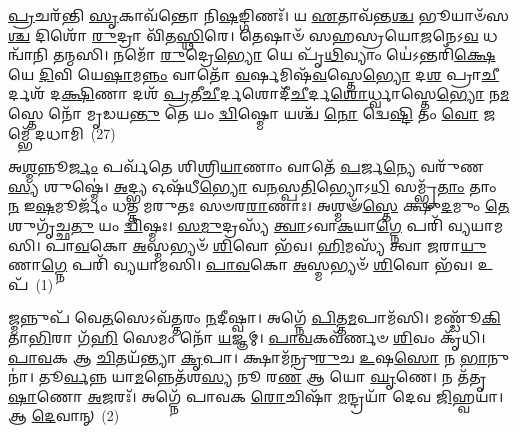 \-\ul{𑌪𑍍𑌰}\-𑌚𑌰᳴𑌨𑍍𑌤𑌿 \ul{𑌸𑍃}\-𑌕𑌾𑌵᳴𑌨𑍍𑌤𑍋 𑌨𑌿\-\ul{𑌷}\-𑌙𑍍𑌗𑌿𑌣𑌃᳴। 𑌯 \ul{𑌏}\-𑌤𑌾𑌵᳴𑌨𑍍𑌤\-\ul{𑌶𑍍𑌚} 𑌭𑍂𑌯𑌾𑍞᳴𑌸\-\ul{𑌶𑍍𑌚} 𑌦𑌿𑌶𑍋᳴ \ul{𑌰𑍁}\-𑌦𑍍𑌰𑌾 𑌵𑌿᳴𑌤\-\ul{𑌸𑍍𑌥𑌿}\-𑌰𑍇। 𑌤𑍇𑌷𑌾𑍞᳴ 𑌸𑌹𑌸𑍍𑌰𑌯𑍋\-\ul{𑌜}\-𑌨𑍇\-𑌽\-\ul{𑌵} 𑌧𑌨𑍍𑌵𑌾᳴𑌨𑌿 𑌤𑌨𑍍𑌮𑌸𑌿। 𑌨𑌮𑍋᳴ \ul{𑌰𑍁}\-𑌦𑍍𑌰𑍇\-\ul{𑌭𑍍𑌯𑍋} 𑌯𑍇 𑌪𑍃᳴\-\ul{𑌥𑌿}\-𑌵𑍍𑌯𑌾𑌂 𑌯𑍇॑\-𑌽𑌨𑍍𑌤𑌰𑌿᳴\-\ul{𑌕𑍍𑌷𑍇} 𑌯𑍇 \ul{𑌦𑌿}\-𑌵𑌿 𑌯𑍇\-\ul{𑌷𑌾}\-𑌮\-\ul{𑌨𑍍𑌨𑌂} 𑌵𑌾𑌤𑍋᳴ \ul{𑌵}\-𑌰𑍍\mbox{}𑌷𑌮𑌿𑌷᳴\-\ul{𑌵}\-𑌸𑍍𑌤𑍇\-\ul{𑌭𑍍𑌯𑍋} 𑌦\-\ul{𑌶} 𑌪𑍍𑌰𑌾\-\ul{𑌚𑍀}\-𑌰𑍍𑌦𑌶᳴ 𑌦\-\ul{𑌕𑍍𑌷𑌿}\-𑌣𑌾 𑌦𑌶᳴ \ul{𑌪𑍍𑌰}\-𑌤𑍀\-\ul{𑌚𑍀}\-𑌰𑍍𑌦𑌶𑍋𑌦𑍀᳴\-\ul{𑌚𑍀}\-𑌰𑍍𑌦\-\ul{𑌶𑍋}\-𑌰𑍍𑌧𑍍𑌵𑌾𑌸𑍍𑌤𑍇\-\ul{𑌭𑍍𑌯𑍋} 𑌨\-\ul{𑌮}\-𑌸𑍍𑌤𑍇 𑌨𑍋᳴ 𑌮𑍃𑌡𑌯\-\ul{𑌨𑍍𑌤𑍁} 𑌤𑍇 𑌯𑌂 \ul{𑌦𑍍𑌵𑌿}\-𑌷𑍍𑌮𑍋 𑌯𑌶𑍍𑌚᳴ \ul{𑌨𑍋} 𑌦𑍍𑌵𑍇\-\ul{𑌷𑍍𑌟𑌿} 𑌤𑌂 \ul{𑌵𑍋} 𑌜𑌮𑍍𑌭𑍇᳴ 𑌦𑌧𑌾𑌮𑌿~(27)


{\anuvakamend[{\-\ul{𑌤𑍀}\-𑌰𑍍𑌥𑌾\-\ul{𑌨𑌿} 𑌯\-\ul{𑌶𑍍𑌚} 𑌷𑌟𑍍𑌚᳴}]}%

{}


\setcounter{anuvakam}{0}
𑌅\-\ul{𑌶𑍍𑌮}\-𑌨𑍍𑌨𑍂\-\ul{𑌰𑍍𑌜𑌂} 𑌪𑌰𑍍𑌵᳴𑌤𑍇 𑌶𑌿𑌶𑍍𑌰𑌿\-\ul{𑌯𑌾}\-𑌣𑌾𑌂 𑌵𑌾𑌤𑍇᳴ \ul{𑌪}\-𑌰𑍍𑌜\-\ul{𑌨𑍍𑌯𑍇} 𑌵𑌰𑍁᳴𑌣\-\ul{𑌸𑍍𑌯} 𑌶𑍁𑌷𑍍𑌮𑍇॑। \ul{𑌅}\-𑌦𑍍𑌭𑍍𑌯 𑌓𑌷᳴𑌧𑍀\-\ul{𑌭𑍍𑌯𑍋} 𑌵\-\ul{𑌨}\-𑌸𑍍𑌪\-\ul{𑌤𑌿}\-𑌭𑍍𑌯𑍋\-𑌽\-\ul{𑌧𑌿} 𑌸𑌮𑍍𑌭𑍃᳴\-\ul{𑌤𑌾𑌂} 𑌤𑌾𑌂 \ul{𑌨} 𑌇\-\ul{𑌷}\-𑌮𑍂𑌰𑍍𑌜𑌂᳴ 𑌧𑌤𑍍𑌤 𑌮𑌰𑍁𑌤𑌃 𑌸𑍞𑌰\-\ul{𑌰𑌾}\-𑌣𑌾𑌃। 𑌅𑌶𑍍𑌮𑍟᳴\-\ul{𑌸𑍍𑌤𑍇} 𑌕𑍍𑌷𑍁\-\ul{𑌦}\-𑌮𑍁𑌂 \ul{𑌤𑍇} 𑌶𑍁𑌗𑍃᳴𑌚𑍍𑌛\-\ul{𑌤𑍁} 𑌯𑌂 \ul{𑌦𑍍𑌵𑌿}\-𑌷𑍍𑌮𑌃। \ul{𑌸}\-\-\ul{𑌮𑍁}\-𑌦𑍍𑌰𑌸𑍍𑌯᳴ \ul{𑌤𑍍𑌵𑌾}\-\-𑌽𑌵𑌾\-\ul{𑌕}\-𑌯𑌾\-\ul{𑌗𑍍𑌨𑍇} 𑌪𑌰𑌿᳴ 𑌵𑍍𑌯𑌯𑌾𑌮𑌸𑌿। 𑌪𑌾\-\ul{𑌵}\-𑌕𑍋 \ul{𑌅}\-𑌸𑍍𑌮𑌭𑍍𑌯𑍞᳴ \ul{𑌶𑌿}\-𑌵𑍋 𑌭᳴𑌵। \ul{𑌹𑌿}\-𑌮𑌸𑍍𑌯᳴ 𑌤𑍍𑌵𑌾 \ul{𑌜}\-𑌰𑌾\-\ul{𑌯𑍁}\-𑌣𑌾\-\ul{𑌗𑍍𑌨𑍇} 𑌪𑌰𑌿᳴ 𑌵𑍍𑌯𑌯𑌾𑌮𑌸𑌿। \ul{𑌪𑌾}\-\-\ul{𑌵}\-𑌕𑍋 \ul{𑌅}\-𑌸𑍍𑌮𑌭𑍍𑌯𑍞᳴ \ul{𑌶𑌿}\-𑌵𑍋 𑌭᳴𑌵। 𑌉𑌪᳴~(1)

𑌜𑍍𑌮𑌨𑍍𑌨𑍁𑌪᳴ 𑌵𑍇\-\ul{𑌤}\-𑌸𑍇\-𑌽𑌵᳴𑌤𑍍𑌤𑌰𑌂 \ul{𑌨}\-𑌦𑍀𑌷𑍍𑌵𑌾। 𑌅𑌗𑍍𑌨𑍇᳴ \ul{𑌪𑌿}\-𑌤𑍍𑌤\-\ul{𑌮}\-𑌪𑌾𑌮᳴𑌸𑌿। 𑌮𑌣𑍍𑌡𑍂᳴\-\ul{𑌕𑌿} 𑌤𑌾\-\ul{𑌭𑌿}\-𑌰𑌾 𑌗᳴\-\ul{𑌹𑌿} 𑌸𑍇𑌮𑌂 𑌨𑍋᳴ \ul{𑌯}\-𑌜𑍍𑌞𑌮𑍍। \ul{𑌪𑌾}\-\-\ul{𑌵}\-𑌕𑌵᳴𑌰𑍍𑌣𑍞 \ul{𑌶𑌿}\-𑌵𑌂 𑌕𑍃᳴𑌧𑌿। \ul{𑌪𑌾}\-\-\ul{𑌵}\-𑌕 𑌆 \ul{𑌚𑌿}\-𑌤𑌯᳴𑌨𑍍𑌤𑍍𑌯𑌾 \ul{𑌕𑍃}\-𑌪𑌾। 𑌕𑍍𑌷𑌾𑌮᳴𑌨𑍍𑌰𑍁\-\ul{𑌰𑍁}\-𑌚 \ul{𑌉}\-𑌷\-\ul{𑌸𑍋} 𑌨 \ul{𑌭𑌾}\-𑌨𑍁𑌨𑌾॑। 𑌤𑍂\-\ul{𑌰𑍍𑌵}\-𑌨𑍍𑌨 𑌯𑌾\-\ul{𑌮}\-𑌨𑍍𑌨𑍇𑌤᳴𑌶\-\ul{𑌸𑍍𑌯} 𑌨𑍂 𑌰\-\ul{𑌣} 𑌆 𑌯𑍋 \ul{𑌘𑍃}\-𑌣𑍇। 𑌨 𑌤᳴𑌤𑍃\-\ul{𑌷𑌾}\-𑌣𑍋 \ul{𑌅}\-𑌜𑌰𑌃᳴। 𑌅𑌗𑍍𑌨𑍇᳴ 𑌪𑌾𑌵𑌕 \ul{𑌰𑍋}\-𑌚𑌿𑌷𑌾᳴ \ul{𑌮}\-𑌨𑍍𑌦𑍍𑌰𑌯𑌾᳴ 𑌦𑍇𑌵 \ul{𑌜𑌿}\-𑌹𑍍𑌵𑌯𑌾॑। 𑌆 \ul{𑌦𑍇}\-𑌵𑌾𑌨𑍍~(2)

